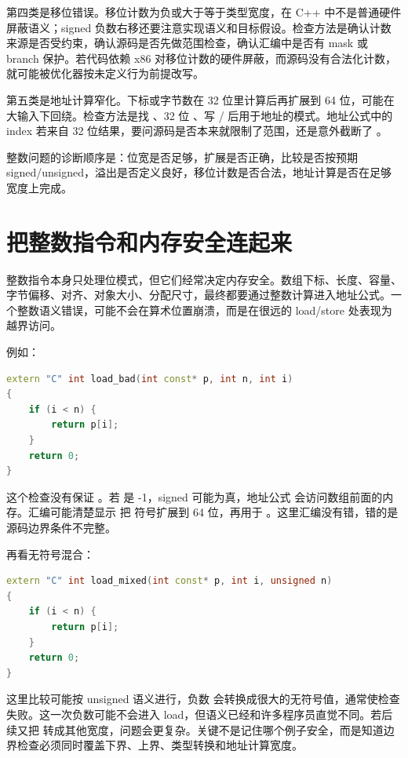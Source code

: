 第四类是移位错误。移位计数为负或大于等于类型宽度，在 C++ 中不是普通硬件屏蔽语义；signed 负数右移还要注意实现语义和目标假设。检查方法是确认计数来源是否受约束，确认源码是否先做范围检查，确认汇编中是否有 mask 或 branch 保护。若代码依赖 x86 对移位计数的硬件屏蔽，而源码没有合法化计数，就可能被优化器按未定义行为前提改写。

第五类是地址计算窄化。下标或字节数在 32 位里计算后再扩展到 64 位，可能在大输入下回绕。检查方法是找 、32 位 、写 / 后用于地址的模式。地址公式中的 index 若来自 32 位结果，要问源码是否本来就限制了范围，还是意外截断了 。

\begin{mentalmodel}
整数问题的诊断顺序是：位宽是否足够，扩展是否正确，比较是否按预期 signed/unsigned，溢出是否定义良好，移位计数是否合法，地址计算是否在足够宽度上完成。
\end{mentalmodel}

\section{把整数指令和内存安全连起来}

整数指令本身只处理位模式，但它们经常决定内存安全。数组下标、长度、容量、字节偏移、对齐、对象大小、分配尺寸，最终都要通过整数计算进入地址公式。一个整数语义错误，可能不会在算术位置崩溃，而是在很远的 load/store 处表现为越界访问。

例如：

\begin{lstlisting}[language=C++]
extern "C" int load_bad(int const* p, int n, int i)
{
    if (i < n) {
        return p[i];
    }
    return 0;
}
\end{lstlisting}

这个检查没有保证 。若  是 -1，signed  可能为真，地址公式  会访问数组前面的内存。汇编可能清楚显示  把  符号扩展到 64 位，再用于 。这里汇编没有错，错的是源码边界条件不完整。

再看无符号混合：

\begin{lstlisting}[language=C++]
extern "C" int load_mixed(int const* p, int i, unsigned n)
{
    if (i < n) {
        return p[i];
    }
    return 0;
}
\end{lstlisting}

这里比较可能按 unsigned 语义进行，负数  会转换成很大的无符号值，通常使检查失败。这一次负数可能不会进入 load，但语义已经和许多程序员直觉不同。若后续又把  转成其他宽度，问题会更复杂。关键不是记住哪个例子安全，而是知道边界检查必须同时覆盖下界、上界、类型转换和地址计算宽度。

